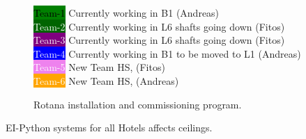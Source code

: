 \begin{fullwidth}
\begin{figure*}
\colorbox{green}{\textcolor{black}{Team-1}} Currently working in B1 (Andreas)\\[3pt]
\colorbox{DarkGreen}{\textcolor{white}{Team-2}} Currently working in L6 shafts going down (Fitos)\\[3pt]
\colorbox{purple}{\textcolor{white}{Team-3}} Currently working in L6 shafts going down (Fitos)\\[3pt]
\colorbox{blue}{\textcolor{white}{Team-4}} Currently working in B1 to be moved to L1 (Andreas)\\[3pt]
\colorbox{violet}{\textcolor{white}{Team-5}} New Team HS, (Fitos)\\[3pt]
\colorbox{orange}{\textcolor{white}{Team-6}} New Team HS, (Andreas)\\[3pt]
\caption{Rotana installation and commissioning program.}
\label{plan}
\end{figure*}

\end{fullwidth}


EI-Python systems for all Hotels affects ceilings.






















